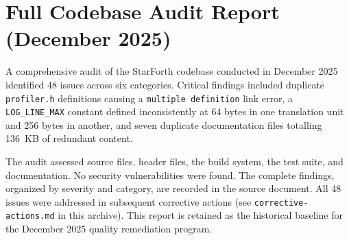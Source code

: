 
\section*{Full Codebase Audit Report (December 2025)}

A comprehensive audit of the StarForth codebase conducted in December 2025
identified 48 issues across six categories. Critical findings included
duplicate \texttt{profiler.h} definitions causing a \texttt{multiple
definition} link error, a \texttt{LOG\_LINE\_MAX} constant defined
inconsistently at 64 bytes in one translation unit and 256 bytes in another,
and seven duplicate documentation files totalling 136~KB of redundant content.

The audit assessed source files, header files, the build system, the test
suite, and documentation. No security vulnerabilities were found. The complete
findings, organized by severity and category, are recorded in the source
document. All 48 issues were addressed in subsequent corrective actions (see
\texttt{corrective-actions.md} in this archive). This report is retained as
the historical baseline for the December 2025 quality remediation program.
